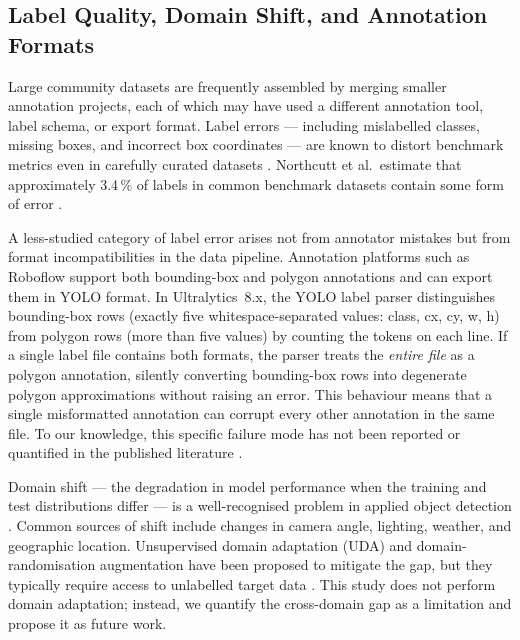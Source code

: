 \subsection{Label Quality, Domain Shift, and Annotation Formats}

Large community datasets are frequently assembled by merging smaller annotation
projects, each of which may have used a different annotation tool, label schema, or
export format.
Label errors — including mislabelled classes, missing boxes, and incorrect box
coordinates — are known to distort benchmark metrics even in carefully curated
datasets \cite{labelerror2023}.
Northcutt et al.\ estimate that approximately 3.4\,\% of labels in common benchmark
datasets contain some form of error \cite{northcutt2021pervasive}.

A less-studied category of label error arises not from annotator mistakes but from
format incompatibilities in the data pipeline.
Annotation platforms such as Roboflow support both bounding-box and polygon
annotations and can export them in YOLO format.
In Ultralytics~8.x, the YOLO label parser distinguishes bounding-box rows (exactly
five whitespace-separated values: class, cx, cy, w, h) from polygon rows (more than
five values) by counting the tokens on each line.
If a single label file contains both formats, the parser treats the \emph{entire file}
as a polygon annotation, silently converting bounding-box rows into degenerate polygon
approximations without raising an error.
This behaviour means that a single misformatted annotation can corrupt every other
annotation in the same file.
To our knowledge, this specific failure mode has not been reported or quantified in
the published literature \cite{ultralytics_repo}.

Domain shift — the degradation in model performance when the training and test
distributions differ — is a well-recognised problem in applied object detection
\cite{chen2018domain}.
Common sources of shift include changes in camera angle, lighting, weather, and
geographic location.
Unsupervised domain adaptation (UDA) and domain-randomisation augmentation have been
proposed to mitigate the gap, but they typically require access to unlabelled target
data \cite{chen2018domain}.
This study does not perform domain adaptation; instead, we quantify the cross-domain
gap as a limitation and propose it as future work.

